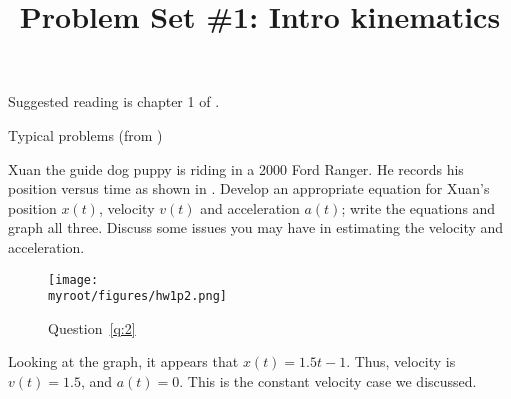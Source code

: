 \documentclass [hw,noanswers]{exam}
\title{Problem Set \#1: Intro kinematics}
\author{\mobeardInstructorShort}
\date{\printdate{6/15/2021}}
\newcommand\myroot{..}
\begin{document}
\maketitle

Suggested reading is chapter 1 of \citet{kleppner2014introduction}.

\begin{questions}
\question Typical problems (from \citet{hecht2018schaums})

\question\label{q:2} Xuan the guide dog puppy is riding in a 2000 Ford Ranger. He records his position versus time as shown in . Develop an appropriate equation for Xuan's position $x(t)$, velocity $v(t)$ and acceleration $a(t)$; write the equations and graph all three. Discuss some issues you may have in estimating the velocity and acceleration. 
\begin{figure}[h]
\begin{center}
\texttt{[image: \\myroot/figures/hw1p2.png]}
\end{center}
\caption{Question~\ref{q:2}}
\label{fig:q2}
\end{figure}
\begin{solution}
Looking at the graph, it appears that $x(t)=1.5t-1$. Thus, velocity is $v(t)=1.5$, and $a(t)=0$. This is the constant velocity case we discussed. 


\end{solution}
\end{questions}
\end{document}
